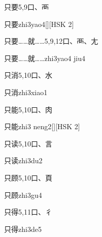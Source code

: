 \begin{entry}{只要}{5,9}{⼝、⾑}
  \begin{phonetics}{只要}{zhi3yao4}[][HSK 2]
  \end{phonetics}
\end{entry}

\begin{entry}{只要……就……}{5,9,12}{⼝、⾑、⼪}
  \begin{phonetics}{只要……就……}{zhi3yao4 jiu4}
  \end{phonetics}
\end{entry}

\begin{entry}{只消}{5,10}{⼝、⽔}
  \begin{phonetics}{只消}{zhi3xiao1}
  \end{phonetics}
\end{entry}

\begin{entry}{只能}{5,10}{⼝、⾁}
  \begin{phonetics}{只能}{zhi3 neng2}[][HSK 2]
  \end{phonetics}
\end{entry}

\begin{entry}{只读}{5,10}{⼝、⾔}
  \begin{phonetics}{只读}{zhi3du2}
  \end{phonetics}
\end{entry}

\begin{entry}{只顾}{5,10}{⼝、⾴}
  \begin{phonetics}{只顾}{zhi3gu4}
  \end{phonetics}
\end{entry}

\begin{entry}{只得}{5,11}{⼝、⼻}
  \begin{phonetics}{只得}{zhi3de5}
  \end{phonetics}
\end{entry}

